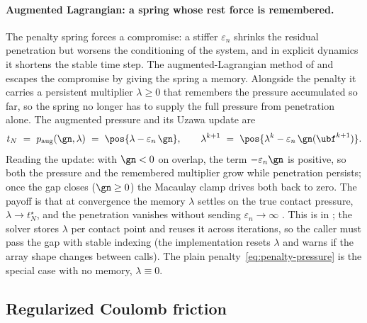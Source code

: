 \paragraph{Augmented Lagrangian: a spring whose rest force is remembered.}
The penalty spring forces a compromise: a stiffer $\varepsilon_n$ shrinks the residual penetration but
worsens the conditioning of the system, and in explicit dynamics it shortens the stable time step. The
augmented-Lagrangian method of \citet{alart1991mixed} and \citet{simo1992augmented} escapes the
compromise by giving the spring a memory. Alongside the penalty it carries a persistent multiplier
$\lambda\ge0$ that remembers the pressure accumulated so far, so the spring no longer has to supply the
full pressure from penetration alone. The augmented pressure and its Uzawa update are
\begin{equation}\label{eq:al-pressure}
t_N\ =\ p_{\mathrm{aug}}(\gn,\lambda)\ =\ \pos{\lambda-\varepsilon_n\,\gn},
\qquad
\lambda^{k+1}\ =\ \pos{\lambda^{k}-\varepsilon_n\,\gn(\ubf^{k+1})} .
\end{equation}
Reading the update: with $\gn<0$ on overlap, the term $-\varepsilon_n\gn$ is positive, so both the
pressure and the remembered multiplier grow while penetration persists; once the gap closes
($\gn\ge0$) the Macaulay clamp drives both back to zero. The payoff is that at convergence the memory
$\lambda$ settles on the true contact pressure, $\lambda\to t_N^\star$, and the penetration vanishes
without sending $\varepsilon_n\to\infty$ \citep{laursen2002computational}. This is
 in ; the solver stores
$\lambda$ per contact point and reuses it across iterations, so the caller must pass the gap with
stable indexing (the implementation resets $\lambda$ and warns if the array shape changes between
calls). The plain penalty~\eqref{eq:penalty-pressure} is the special case with no memory,
$\lambda\equiv0$.

\subsection{Regularized Coulomb friction}\label{sec:form-friction}

